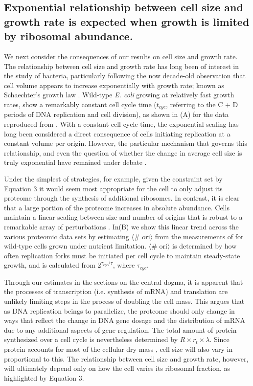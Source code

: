\subsection{Exponential relationship between cell size and growth rate is
expected when growth is limited by ribosomal abundance.}

We next consider the consequences of our results on
cell size and growth rate. The relationship between cell size and growth rate
has long been of interest in the study of bacteria, particularly following the
now decade-old observation that cell volume appears to increase exponentially
with growth rate; known as Schaechter's growth law  \citep{schaechter1958,
taheriaraghi2015}. Wild-type \textit{E. coli} growing at relatively fast growth
rates, show a remarkably constant cell cycle time ($t_{cyc}$, referring to the C +
D periods of DNA replication and cell division), as shown in (A) for the
data reproduced from \citep{si2017}. With a constant cell cycle time, the
exponential scaling has long been considered a direct consequence of cells
initiating replication at a constant volume per origin. However, the particular
mechanism that governs this relationship, and even the question of whether the
change in average cell size is truly exponential  have remained under
debate \citep{si2017, harris2018}.

Under the simplest of strategies, for example, given the constraint set by
Equation 3 it would seem most appropriate for the cell to only adjust its
proteome through the synthesis of additional ribosomes. In contrast, it is clear
that a large portion of the proteome increases in absolute abundance. Cells
maintain a linear scaling between size and number of origins that is robust to
a remarkable array of perturbations \citep{si2017}.  In(B) we show this
linear trend across the various proteomic data sets by estimating $\langle$\#
ori$\rangle$ from the measurements of \cite{si2017} for wild-type cells grown
under nutrient limitation. $\langle$\# ori$\rangle$ is determined by how often
replication forks must be initiated per cell cycle to maintain steady-state
growth, and is calculated from  2$^{\tau_{cyc} / \tau}$, where $\tau_{cyc}$.

Through our estimates in the sections on the central dogma, it is
apparent that the processes of transcription (i.e. synthesis of mRNA) and
translation are unlikely limiting steps in the process of doubling the
cell mass. This argues that as DNA replication beings to parallelize, the
proteome should only change in ways that reflect the change in DNA gene dosage
and the distribution of mRNA due to any additional aspects of gene regulation.
The total amount of protein synthesized over a cell cycle is nevertheless
determined by $R \times r_t \times \lambda$. Since protein accounts for most of
the cellular dry mass \citep{bremer2008, basan2015}, cell size will also vary
in proportional to this. The relationship between cell size and growth rate,
however, will ultimately depend only on how the cell varies its ribosomal
fraction, as highlighted by Equation 3.

